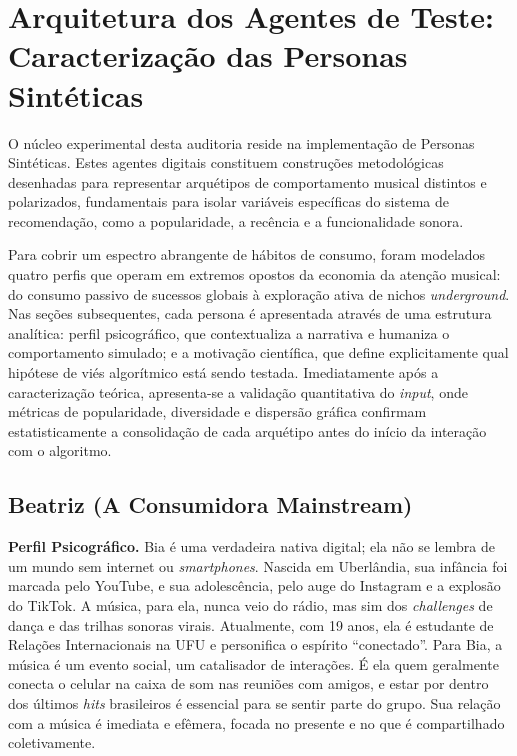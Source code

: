 \documentclass[12pt, %
openright,
oneside, %
a4paper,    %
english,   %
brazil]{facom-ufu-abntex2}
\begin{document}
\section{Arquitetura dos Agentes de Teste: Caracterização das Personas Sintéticas}
\label{sec:personas}

O núcleo experimental desta auditoria reside na implementação de Personas
Sintéticas. Estes agentes digitais constituem construções metodológicas
desenhadas para representar arquétipos de comportamento musical distintos e
polarizados, fundamentais para isolar variáveis específicas do sistema de
recomendação, como a popularidade, a recência e a funcionalidade sonora.

Para cobrir um espectro abrangente de hábitos de consumo, foram modelados quatro
perfis que operam em extremos opostos da economia da atenção musical: do consumo
passivo de sucessos globais à exploração ativa de nichos \emph{underground}. Nas
seções subsequentes, cada persona é apresentada através de uma estrutura
analítica: perfil psicográfico, que contextualiza a narrativa e humaniza o
comportamento simulado; e a motivação científica, que define explicitamente qual
hipótese de viés algorítmico está sendo testada. Imediatamente após a
caracterização teórica, apresenta-se a validação quantitativa do \emph{input},
onde métricas de popularidade, diversidade e dispersão gráfica confirmam
estatisticamente a consolidação de cada arquétipo antes do início da interação
com o algoritmo.

\subsection{Beatriz (A Consumidora Mainstream)}

\textbf{Perfil Psicográfico.} Bia é uma verdadeira nativa digital; ela não se
lembra de um mundo sem internet ou \emph{smartphones}. Nascida em Uberlândia, sua
infância foi marcada pelo YouTube, e sua adolescência, pelo auge do Instagram e a
explosão do TikTok. A música, para ela, nunca veio do rádio, mas sim dos
\emph{challenges} de dança e das trilhas sonoras virais. Atualmente, com 19 anos,
ela é estudante de Relações Internacionais na UFU e personifica o espírito
``conectado''. Para Bia, a música é um evento social, um catalisador de
interações. É ela quem geralmente conecta o celular na caixa de som nas reuniões
com amigos, e estar por dentro dos últimos \emph{hits} brasileiros é essencial
para se sentir parte do grupo. Sua relação com a música é imediata e efêmera,
focada no presente e no que é compartilhado coletivamente.
\end{document}
